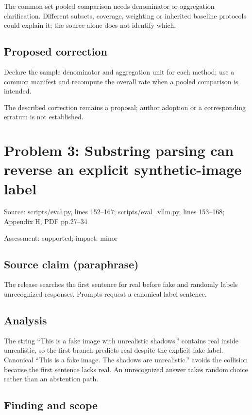 \documentclass[11pt]{article}
\begin{document}
The common-set pooled comparison needs denominator or aggregation clarification. Different subsets, coverage, weighting or inherited baseline protocols could explain it; the source alone does not identify which.

\subsection*{Proposed correction}

Declare the sample denominator and aggregation unit for each method; use a common manifest and recompute the overall rate when a pooled comparison is intended.

The described correction remains a proposal; author adoption or a corresponding erratum is not established.

\section*{Problem 3: Substring parsing can reverse an explicit synthetic-image label}

Source: scripts/eval.py, lines 152–167; scripts/eval\_vllm.py, lines 153–168; Appendix H, PDF pp.27–34

Assessment: supported; impact: minor

\subsection*{Source claim (paraphrase)}

The release searches the first sentence for real before fake and randomly labels unrecognized responses. Prompts request a canonical label sentence.

\subsection*{Analysis}

The string “This is a fake image with unrealistic shadows.” contains real inside unrealistic, so the first branch predicts real despite the explicit fake label. Canonical “This is a fake image. The shadows are unrealistic.” avoids the collision because the first sentence lacks real. An unrecognized answer takes random.choice rather than an abstention path.

\subsection*{Finding and scope}
\end{document}
